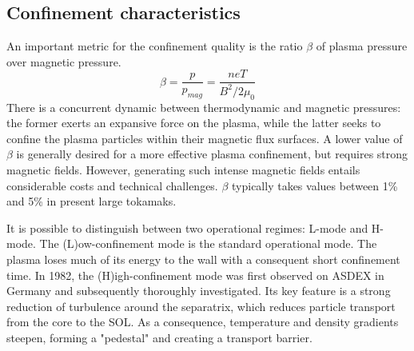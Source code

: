 \subsection{Confinement characteristics}
\label{eq:intro_confinement}
An important metric for the confinement quality is the ratio $\beta$ of plasma pressure over magnetic pressure.
\begin{equation}
	\label{eq:PlasmaBeta}
	\beta = \frac{p}{p_{mag}} = \frac{neT}{B^2/2\mu_0}
\end{equation}
There is a concurrent dynamic between thermodynamic and magnetic pressures: the former exerts an expansive force on the plasma, while the latter seeks to confine the plasma particles within their magnetic flux surfaces. A lower value of $\beta$ is generally desired for a more effective plasma confinement, but requires strong magnetic fields. However, generating such intense magnetic fields entails considerable costs and technical challenges. $\beta$ typically takes values between 1\% and 5\% in present large tokamaks. 

It is possible to distinguish between two operational regimes: L-mode and H-mode. The (L)ow-confinement mode is the standard operational mode. The plasma loses much of its energy to the wall with a consequent short confinement time. In 1982, the (H)igh-confinement mode was first observed on ASDEX in Germany and subsequently thoroughly investigated\cite{asdex1989h}. Its key feature is a strong reduction of turbulence around the separatrix, which reduces particle transport from the core to the SOL. As a consequence, temperature and density gradients steepen, forming a "pedestal" and creating a transport barrier. 











